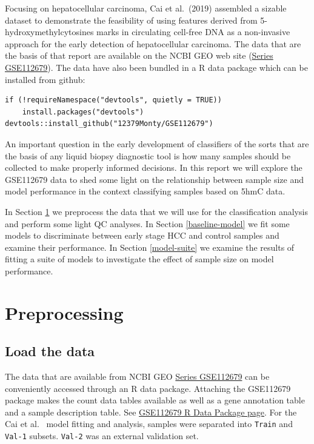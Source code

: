 \documentclass[
]{book}
\begin{document}
Focusing on hepatocellular carcinoma, Cai et al.~(2019) \citep{Cai:2019aa} assembled a sizable dataset
to demonstrate the feasibility of using features derived from
5-hydroxymethylcytosines marks in circulating cell-free DNA as
a non-invasive approach for the early detection of
hepatocellular carcinoma. The data that are the basis of that
report are available on the NCBI GEO web site
(\href{https://www.ncbi.nlm.nih.gov/geo/query/acc.cgi?acc=GSE112679}{Series GSE112679}).
The data have also been bundled in a R data package which can be installed from github:

\begin{verbatim}
if (!requireNamespace("devtools", quietly = TRUE))
    install.packages("devtools")
devtools::install_github("12379Monty/GSE112679")
\end{verbatim}

An important question in the early development of classifiers of the sorts
that are the basis of any liquid biopsy diagnostic tool is how many samples
should be collected to make properly informed decisions. In this
report we will explore the GSE112679 data to shed some light on
the relationship between sample size and model performance
in the context classifying samples based on 5hmC data.

In Section \ref{preproc} we preprocess the data that
we will use for the classification analysis and perform some light QC analyses.
In Section \ref{baseline-model} we fit some models to discriminate between
early stage HCC and control samples and examine their performance.
In Section \ref{model-suite} we examine the results of fitting a suite of models to
investigate the effect of sample size on model performance.

\hypertarget{preproc}{%
\chapter{Preprocessing}\label{preproc}}

\hypertarget{load-the-data}{%
\section{Load the data}\label{load-the-data}}

The data that are available from NCBI GEO
\href{https://www.ncbi.nlm.nih.gov/geo/query/acc.cgi?acc=GSE112679}{Series GSE112679}
can be conveniently accessed through an R data package.
Attaching the GSE112679 package makes the count data tables
available as well as a gene annotation table and a sample description table.
See \href{https://12379monty.github.io/GSE112679/}{GSE112679 R Data Package page}.
For the Cai et al.~\citep{Cai:2019aa} model fitting and analysis, samples were separated into
\texttt{Train} and \texttt{Val-1} subsets. \texttt{Val-2} was an external validation set.
\end{document}
